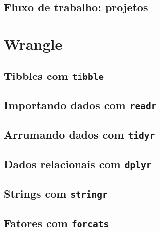 \documentclass[
]{book}
\theoremstyle{definition}
\theoremstyle{definition}
\theoremstyle{definition}
\theoremstyle{definition}
\theoremstyle{remark}
\begin{document}
\hypertarget{fluxo-de-trabalho-projetos}{%
\chapter{Fluxo de trabalho: projetos}\label{fluxo-de-trabalho-projetos}}

\hypertarget{part-wrangle}{%
\part{Wrangle}\label{part-wrangle}}

\hypertarget{tibbles-com-tibble}{%
\chapter{\texorpdfstring{Tibbles com \texttt{tibble}}{Tibbles com tibble}}\label{tibbles-com-tibble}}

\hypertarget{importando-dados-com-readr}{%
\chapter{\texorpdfstring{Importando dados com \texttt{readr}}{Importando dados com readr}}\label{importando-dados-com-readr}}

\hypertarget{arrumando-dados-com-tidyr}{%
\chapter{\texorpdfstring{Arrumando dados com \texttt{tidyr}}{Arrumando dados com tidyr}}\label{arrumando-dados-com-tidyr}}

\hypertarget{dados-relacionais-com-dplyr}{%
\chapter{\texorpdfstring{Dados relacionais com \texttt{dplyr}}{Dados relacionais com dplyr}}\label{dados-relacionais-com-dplyr}}

\hypertarget{strings-com-stringr}{%
\chapter{\texorpdfstring{Strings com \texttt{stringr}}{Strings com stringr}}\label{strings-com-stringr}}

\hypertarget{fatores-com-forcats}{%
\chapter{\texorpdfstring{Fatores com \texttt{forcats}}{Fatores com forcats}}\label{fatores-com-forcats}}
\end{document}
